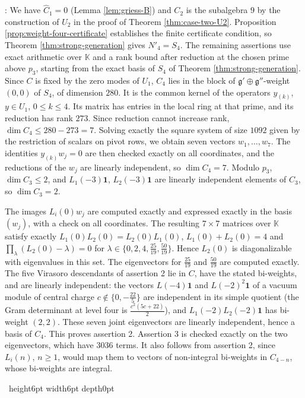 \documentclass[leqno]{article}
\newcommand{\K}{\ensuremath{\mathbb{K}}}
\renewcommand{\leq}{\ensuremath{\leqslant}}
\renewcommand{\geq}{\ensuremath{\geqslant}}
\newcommand{\qed}{\hfill \vrule height6pt  width6pt depth0pt}
\newenvironment{proof}[1][]{\noindent {\it Proof #1} : }{\hbox{~}\qed
\smallskip
}
\numberwithin{equation}{section}
\begin{document}
\begin{proof}
We have $\widehat C_1 = 0$ (Lemma \ref{lem:griess-B}) and $C_2$ is the subalgebra $9$ by the construction of $U_2$ in the proof of Theorem \ref{thm:case-two-U2}. Proposition \ref{prop:weight-four-certificate} establishes the finite certificate condition, so Theorem \ref{thm:strong-generation} gives $N'_4 = S_4$. The remaining assertions use exact arithmetic over $\K$ and a rank bound after reduction at the chosen prime above $p_3$, starting from the exact basis of $S_4$ of Theorem \ref{thm:strong-generation}. Since $C$ is fixed by the zero modes of $U_1$, $C_4$ lies in the block of $\mathfrak g' \oplus \mathfrak g''$-weight $(0,0)$ of $S_4$, of dimension $280$. It is the common kernel of the operators $y_{(k)}$, $y \in U_1$, $0 \leq k \leq 4$. Its matrix has entries in the local ring at that prime, and its reduction has rank $273$. Since reduction cannot increase rank, $\dim C_4 \leq 280-273 = 7$. Solving exactly the square system of size $1092$ given by the restriction of scalars on pivot rows, we obtain seven vectors $w_1, \ldots, w_7$. The identities $y_{(k)}w_j = 0$ are then checked exactly on all coordinates, and the reductions of the $w_j$ are linearly independent, so $\dim C_4 = 7$. Modulo $p_3$, $\dim C_3 \leq 2$, and $L_1(-3)\mathbf 1$, $L_2(-3)\mathbf 1$ are linearly independent elements of $C_3$, so $\dim C_3 = 2$.

The images $L_i(0)w_j$ are computed exactly and expressed exactly in the basis $(w_j)$, with a check on all coordinates. The resulting $7 \times 7$ matrices over $\K$ satisfy exactly $L_1(0)L_2(0) = L_2(0)L_1(0)$, $L_1(0)+L_2(0) = 4$ and $\prod_\lambda (L_2(0)-\lambda) = 0$ for $\lambda \in \{0,2,4,\frac{25}{19},\frac{50}{19}\}$. Hence $L_2(0)$ is diagonalizable with eigenvalues in this set. The eigenvectors for $\frac{25}{19}$ and $\frac{50}{19}$ are computed exactly. The five Virasoro descendants of assertion 2 lie in $C$, have the stated bi-weights, and are linearly independent: the vectors $L(-4)\mathbf 1$ and $L(-2)^2\mathbf 1$ of a vacuum module of central charge $c \notin \{0,-\frac{22}{5}\}$ are independent in its simple quotient (the Gram determinant at level four is $\frac{c^2(5c+22)}{2}$), and $L_1(-2)L_2(-2)\mathbf 1$ has bi-weight $(2,2)$. These seven joint eigenvectors are linearly independent, hence a basis of $C_4$. This proves assertion 2. Assertion 3 is checked exactly on the two eigenvectors, which have $3036$ terms. It also follows from assertion 2, since $L_i(n)$, $n \geq 1$, would map them to vectors of non-integral bi-weights in $C_{4-n}$, whose bi-weights are integral.


\end{proof}
\end{document}
